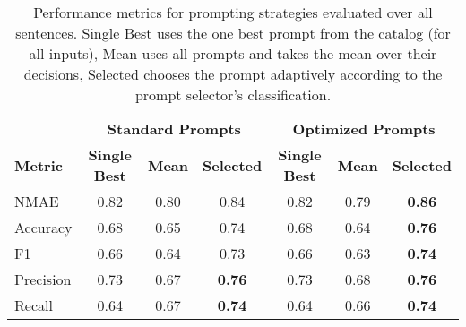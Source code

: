 \begin{table}[ht]
\centering
\caption{Performance metrics for prompting strategies evaluated over all sentences. Single Best uses the one best prompt from the catalog (for all inputs), Mean uses all prompts and takes the mean over their decisions, Selected chooses the prompt adaptively according to the prompt selector's classification.}
\vspace{2pt}
\begin{adjustbox}{width=\columnwidth}
\begin{tabular}{lccc ccc}
\toprule
& \multicolumn{3}{c}{\textbf{Standard Prompts}} & \multicolumn{3}{c}{\textbf{Optimized Prompts}} \\
\cmidrule(lr){2-4} \cmidrule(lr){5-7}
\textbf{Metric}             & \textbf{Single Best} & \textbf{Mean} & \textbf{Selected} & \textbf{Single Best} & \textbf{Mean} & \textbf{Selected} \\
\midrule
NMAE                         & 0.82          & 0.80         & 0.84              & 0.82          & 0.79          & \textbf{0.86}
\\
Accuracy                     & 0.68          & 0.65         & 0.74              & 0.68          & 0.64          & \textbf{0.76}               \\
F1                           & 0.66          & 0.64         & 0.73              & 0.66          & 0.63          & \textbf{0.74}               \\
Precision                    & 0.73          & 0.67         & \textbf{0.76}              & 0.73          & 0.68          & \textbf{0.76}               \\
Recall                       & 0.64          & 0.67         & \textbf{0.74}              & 0.64          & 0.66          & \textbf{0.74}               \\
\bottomrule
\end{tabular}
\end{adjustbox}
\label{table:optimized}
\end{table}